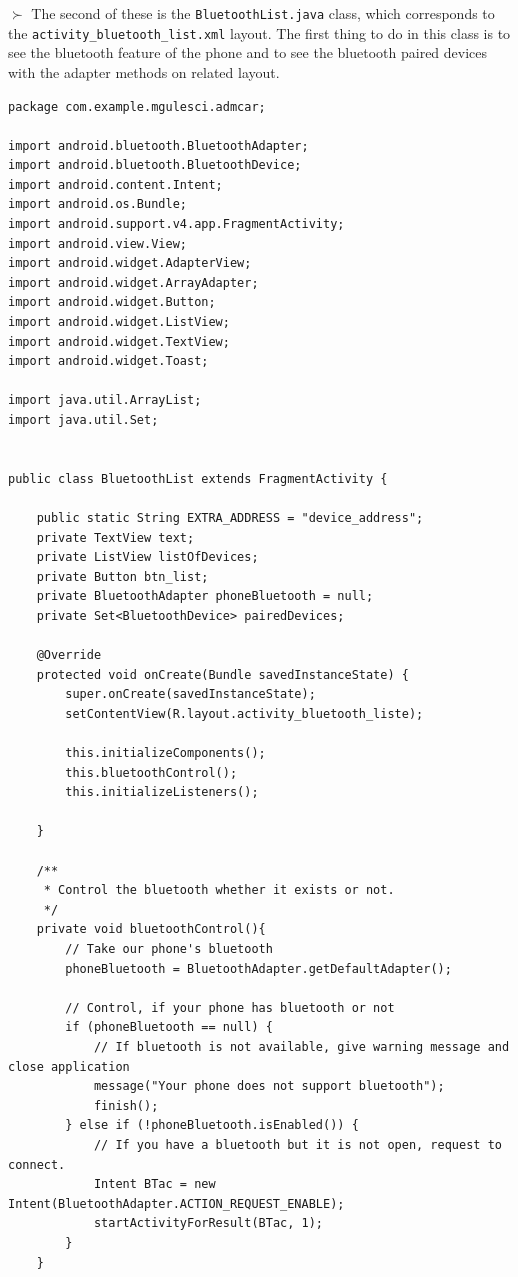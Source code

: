 \documentclass[11pt]{article}
\begin{document}
\begin{flushleft}
$\succ$ The second of these is the \verb|BluetoothList.java| class, which corresponds to the \verb|activity_bluetooth_list.xml| layout. The first thing to do in this class is to see the bluetooth feature of the phone and to see the bluetooth paired devices with the adapter methods on related layout.
\end{flushleft}
\vspace{0.1cm}
\begin{lstlisting}
package com.example.mgulesci.admcar;

import android.bluetooth.BluetoothAdapter;
import android.bluetooth.BluetoothDevice;
import android.content.Intent;
import android.os.Bundle;
import android.support.v4.app.FragmentActivity;
import android.view.View;
import android.widget.AdapterView;
import android.widget.ArrayAdapter;
import android.widget.Button;
import android.widget.ListView;
import android.widget.TextView;
import android.widget.Toast;

import java.util.ArrayList;
import java.util.Set;


public class BluetoothList extends FragmentActivity {

    public static String EXTRA_ADDRESS = "device_address";
    private TextView text;
    private ListView listOfDevices;
    private Button btn_list;
    private BluetoothAdapter phoneBluetooth = null;
    private Set<BluetoothDevice> pairedDevices;

    @Override
    protected void onCreate(Bundle savedInstanceState) {
        super.onCreate(savedInstanceState);
        setContentView(R.layout.activity_bluetooth_liste);

        this.initializeComponents();
        this.bluetoothControl();
        this.initializeListeners();

    }

    /**
     * Control the bluetooth whether it exists or not.
     */
    private void bluetoothControl(){
        // Take our phone's bluetooth
        phoneBluetooth = BluetoothAdapter.getDefaultAdapter();

        // Control, if your phone has bluetooth or not
        if (phoneBluetooth == null) {
            // If bluetooth is not available, give warning message and close application
            message("Your phone does not support bluetooth");
            finish();
        } else if (!phoneBluetooth.isEnabled()) {
            // If you have a bluetooth but it is not open, request to connect.
            Intent BTac = new Intent(BluetoothAdapter.ACTION_REQUEST_ENABLE);
            startActivityForResult(BTac, 1);
        }
    }


\end{lstlisting}
\end{document}
